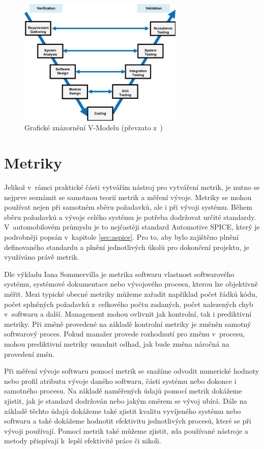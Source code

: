 \documentclass[czech,master]{diploma}
\begin{document}
 \begin{figure}[!ht]
    \centering
    \includegraphics[width=0.7\textwidth]{Diplomka/Figures/v-model-in-software-testing.png}
    \caption{Grafické znázornění V-Modelu (převzato z~\cite{ref:vmodel_Tierno2016})}
    \label{fig:v_model}
\end{figure}


\chapter{Metriky}
\label{sec:metrics}
Jelikož v~rámci praktické části vytvářím nástroj pro vytváření metrik, je nutno se nejprve seznámit se samotnou teorií metrik a měření vývoje. Metriky se mohou používat nejen při samotném sběru požadavků, ale i při vývoji systému. Během sběru požadavků a vývoje celého systému je potřeba dodržovat určité standardy. V~automobilovém průmyslu je to nejčastěji standard Automotive SPICE, který je podrobněji popsán v~kapitole \ref{sec:aspice}. Pro to, aby bylo zajištěno plnění definovaného standardu a plnění jednotlivých úkolů pro dokončení projektu, je využíváno právě metrik.

Dle výkladu Iana Sommervilla \cite{ref:metric_definition} je metrika softwaru vlastnost softwarového systému, systémové dokumentace nebo vývojového procesu, kterou lze objektivně měřit. Mezi typické obecné metriky můžeme zařadit například počet řádků kódu, počet splněných požadavků z~celkového počtu zadaných, počet nalezených chyb v~softwaru a další. Management mohou ovlivnit jak kontrolní, tak i prediktivní metriky. Při změně provedené na základě kontrolní metriky je změněn samotný softwarový proces. Pokud manažer provede rozhodnutí pro změnu v~procesu, mohou prediktivní metriky usnadnit odhad, jak bude změna náročná na provedení změn.

Při měření vývoje softwaru pomocí metrik se snažíme odvodit numerické hodnoty nebo profil atributu vývoje daného softwaru, části systému nebo dokonce i samotného procesu. Na základě naměřených údajů pomocí metrik dokážeme zjistit, jak je standard dodržován nebo jakým směrem se vývoj ubírá. Dále na základě těchto údajů dokážeme také zjistit kvalitu vyvíjeného systému nebo softwaru a také dokážeme hodnotit efektivitu jednotlivých procesů, které se při vývoji používají. Pomocí metrik také můžeme zjistit, zda používané nástroje a metody přispívají k~lepší efektivitě práce či nikoli.
\end{document}
